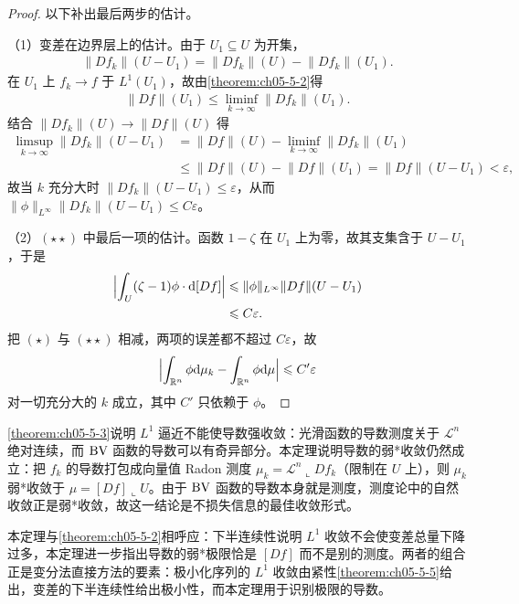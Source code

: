 \documentclass[../../main.tex]{subfiles}%
\begin{document}
\begin{proof}
以下补出最后两步的估计。

（1）变差在边界层上的估计。由于 $U_1\subseteq U$ 为开集，
\begin{align*}
\lVert Df_k\rVert(U-U_1)=\lVert Df_k\rVert(U)-\lVert Df_k\rVert(U_1).
\end{align*}
在 $U_1$ 上 $f_k\to f$ 于 $L^1(U_1)$，故由\cref{theorem:ch05-5-2}得%
\begin{align*}
\lVert Df\rVert(U_1)\leqslant\liminf_{k\to\infty}\lVert Df_k\rVert(U_1).
\end{align*}
结合 $\lVert Df_k\rVert(U)\to\lVert Df\rVert(U)$ 得
\begin{align*}
\limsup_{k\to\infty}\lVert Df_k\rVert(U-U_1)&=\lVert Df\rVert(U)-\liminf_{k\to\infty}\lVert Df_k\rVert(U_1)\\
&\leqslant\lVert Df\rVert(U)-\lVert Df\rVert(U_1)=\lVert Df\rVert(U-U_1)<\varepsilon ,
\end{align*}
故当 $k$ 充分大时 $\lVert Df_k\rVert(U-U_1)\leqslant\varepsilon$，从而 $\lVert\phi\rVert_{L^{\infty}}\lVert Df_k\rVert(U-U_1)\leqslant C\varepsilon$。

（2）$(\star\star)$ 中最后一项的估计。函数 $1-\zeta$ 在 $U_1$ 上为零，故其支集含于 $U-U_1$，于是
\begin{align*}
\Bigl\lvert\int_U(\zeta-1)\phi\cdot\mathrm{d}[Df]\Bigr\rvert&\leqslant\lVert\phi\rVert_{L^{\infty}}\lVert Df\rVert(U-U_1)\\
&\leqslant C\varepsilon .
\end{align*}
把 $(\star)$ 与 $(\star\star)$ 相减，两项的误差都不超过 $C\varepsilon$，故
\begin{align*}
\Bigl\lvert\int_{\mathbb{R}^n}\phi\mathrm{d}\mu_k-\int_{\mathbb{R}^n}\phi\mathrm{d}\mu\Bigr\rvert\leqslant C'\varepsilon
\end{align*}
对一切充分大的 $k$ 成立，其中 $C'$ 只依赖于 $\phi$。
\end{proof}

\begin{remark}\label{remark:ch05-thm-5-4-动机}
\cref{theorem:ch05-5-3}说明 $L^1$ 逼近不能使导数强收敛：光滑函数的导数测度关于 $\mathcal{L}^n$ 绝对连续，而 $\mathrm{BV}$ 函数的导数可以有奇异部分。本定理说明导数的弱*收敛仍然成立：把 $f_k$ 的导数打包成向量值 Radon 测度 $\mu_k=\mathcal{L}^n\llcorner Df_k$（限制在 $U$ 上），则 $\mu_k$ 弱*收敛于 $\mu=[Df]\llcorner U$。由于 $\mathrm{BV}$ 函数的导数本身就是测度，测度论中的自然收敛正是弱*收敛，故这一结论是不损失信息的最佳收敛形式。%

本定理与\cref{theorem:ch05-5-2}相呼应：下半连续性说明 $L^1$ 收敛不会使变差总量下降过多，本定理进一步指出导数的弱*极限恰是 $[Df]$ 而不是别的测度。两者的组合正是变分法直接方法的要素：极小化序列的 $L^1$ 收敛由紧性\cref{theorem:ch05-5-5}给出，变差的下半连续性给出极小性，而本定理用于识别极限的导数。%
\end{remark}
\end{document}
